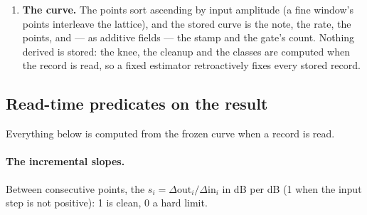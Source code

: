 \documentclass[11pt,a4paper]{article}
\begin{document}
{\begin{enumerate}
\item \textbf{The curve.} The points sort ascending by input amplitude
(a fine window's points interleave the lattice), and the stored curve is
the note, the rate, the points, and --- as additive fields --- the stamp
and the gate's count. Nothing derived is stored: the knee, the cleanup
and the classes are computed when the record is read, so a fixed
estimator retroactively fixes every stored record.
\end{enumerate}
\par}

\subsection{Read-time predicates on the result}
\label{sec:compression-predicates}
Everything below is computed from the frozen curve when a record is read.

\paragraph{The incremental slopes.} Between consecutive points, the
 $s_i = \Delta\mathrm{out}_i / \Delta\mathrm{in}_i$
in dB per dB (1 when the input step is not positive): 1 is clean, 0 a
hard limit.
\end{document}
